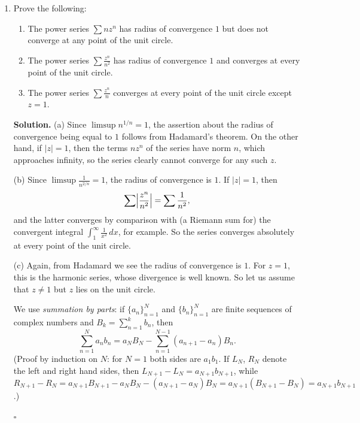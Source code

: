 \documentclass[12pt, reqno]{amsart}
\theoremstyle{definition}
\newenvironment{solution}
  {\par\smallskip\begin{tcolorbox}[breakable, enhanced, colback=solblue, colframe=solframe,
     boxrule=0.5pt, arc=2pt, left=6pt, right=6pt, top=4pt, bottom=4pt]\noindent\textbf{Solution.}}
  {\hfill$\square$\end{tcolorbox}\par\medskip}
\numberwithin{equation}{subsection}
\numberwithin{equation}{section}
\begin{document}
\begin{enumerate}
\begin{solution}
\medskip
\noindent (c) Again, we use Hadamard's criterion to compute $\limsup_{n\to\infty}|n^da_n|^{1/n}$. First,
\[
\lim_{n\to\infty}n^{d/n}=\lim_{n\to\infty}e^{\frac{d\log n}{n}}=1 .
\]
Since $|n^da_n|^{1/n}=n^{d/n}|a_n|^{1/n}$, and $n^{d/n}$ is a sequence of positive numbers with limit $1$, the remarks
before Theorem 2.6 in Lang (p.~55) (if $\lim t_n=t$ exists and $t\neq0,\infty$, then $\limsup t_ns_n=t\limsup s_n$)
give
\[
\limsup_{n\to\infty}|n^da_n|^{1/n}=\limsup_{n\to\infty}|a_n|^{1/n}=1/r .
\]
Hence $\sum n^da_nz^n$ also has radius of convergence $r$.
\end{solution}

\item Prove the following:
\begin{enumerate}
\item The power series $\sum nz^n$ has radius of convergence $1$ but does not converge at any point of the unit circle.
\item The power series $\sum \frac{z^n}{n^2}$ has radius of convergence $1$ and converges at every point of the unit circle.
\item The power series $\sum \frac{z^n}{n}$ converges at every point of the unit circle except $z=1$.
\end{enumerate}

\begin{solution}
\noindent (a) Since $\limsup n^{1/n}=1$, the assertion about the radius of convergence being equal to $1$ follows from
Hadamard's theorem. On the other hand, if $|z|=1$, then the terms $nz^n$ of the series have norm $n$, which approaches
infinity, so the series clearly cannot converge for any such $z$.

\medskip
\noindent (b) Since $\limsup\frac{1}{n^{2/n}}=1$, the radius of convergence is $1$. If $|z|=1$, then
\[
\sum\Bigl|\frac{z^n}{n^2}\Bigr|=\sum\frac1{n^2},
\]
and the latter converges by comparison with (a Riemann sum for) the convergent integral $\int_1^\infty\frac{1}{x^2}\,dx$, for
example. So the series converges absolutely at every point of the unit circle.

\medskip
\noindent (c) Again, from Hadamard we see the radius of convergence is $1$. For $z=1$, this is the harmonic series, whose
divergence is well known. So let us assume that $z\neq1$ but $z$ lies on the unit circle.

We use \emph{summation by parts}: if $\{a_n\}_{n=1}^N$ and $\{b_n\}_{n=1}^N$ are finite sequences of complex numbers and
$B_k=\sum_{n=1}^kb_n$, then
\begin{equation}\label{sbp}
\sum_{n=1}^Na_nb_n=a_NB_N-\sum_{n=1}^{N-1}(a_{n+1}-a_n)B_n .
\end{equation}
(Proof by induction on $N$: for $N=1$ both sides are $a_1b_1$. If $L_N$, $R_N$ denote the left and right hand sides, then
$L_{N+1}-L_N=a_{N+1}b_{N+1}$, while
$R_{N+1}-R_N=a_{N+1}B_{N+1}-a_NB_N-(a_{N+1}-a_N)B_N=a_{N+1}(B_{N+1}-B_N)=a_{N+1}b_{N+1}$.)


\end{solution}
\end{enumerate}
\end{document}
